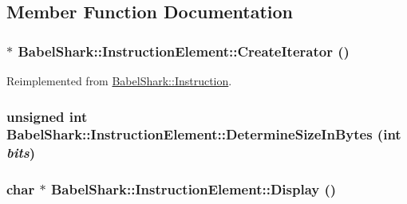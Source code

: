 \subsection{Member Function Documentation}
\hypertarget{class_babel_shark_1_1_instruction_element_dfff8921ea8a00004193d2fec17e9a04}{
\subsubsection[{CreateIterator}]{ $\ast$ BabelShark::InstructionElement::CreateIterator ()}}
\label{class_babel_shark_1_1_instruction_element_dfff8921ea8a00004193d2fec17e9a04}




Reimplemented from \hyperlink{class_babel_shark_1_1_instruction_46ee71e94270716e917ad7293fee5aca}{BabelShark::Instruction}.\hypertarget{class_babel_shark_1_1_instruction_element_db84b955eae4071334e72bfb8b15145d}{
\subsubsection[{DetermineSizeInBytes}]{\setlength{\rightskip}{0pt plus 5cm}unsigned int BabelShark::InstructionElement::DetermineSizeInBytes (int {\em bits})}}
\label{class_babel_shark_1_1_instruction_element_db84b955eae4071334e72bfb8b15145d}


\hypertarget{class_babel_shark_1_1_instruction_element_6c98ad187a2a12399eb90a8cf9e2aec0}{
\subsubsection[{Display}]{\setlength{\rightskip}{0pt plus 5cm}char $\ast$ BabelShark::InstructionElement::Display ()}}
\label{class_babel_shark_1_1_instruction_element_6c98ad187a2a12399eb90a8cf9e2aec0}




